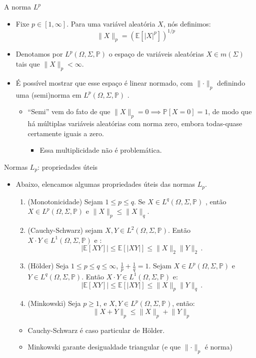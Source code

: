 \documentclass[11pt]{beamer}
\begin{document}
	\begin{frame}{A norma $L^p$}
	\begin{itemize}
		\item Fixe $p \in [1,\infty]$. Para uma variável aleatória $X$, nós definimos:
		$$\lVert X\rVert_p = (\mathbb{E}[|X|^p])^{1/p}$$
		\item Denotamos por $L^p(\Omega, \Sigma, \mathbb{P})$ o espaço de variáveis aleatórias $X \in m(\Sigma)$ tais que $\lVert X\rVert_p<\infty$.
		\item É possível mostrar que esse espaço é linear normado, com $\lVert \cdot \rVert_p$ definindo uma (semi)norma em $L^p(\Omega, \Sigma, \mathbb{P})$ .
		\begin{itemize}
			\item ``Semi'' vem do fato de que $\lVert X \rVert_p = 0 \implies \mathbb{P}[X=0]=1$, de modo que há múltiplas variáveis aleatórias com norma zero, embora todas-quase certamente iguais a zero. 
			\begin{itemize}
				\item Essa multiplicidade não é problemática.
			\end{itemize}
		\end{itemize}
	
	\end{itemize}
	\end{frame}
	\begin{frame}{Normas $L_p$: propriedades úteis}
\begin{itemize}
	\item Abaixo, elencamos algumas propriedades úteis das normas $L_p$.
	\begin{lemma}
		\begin{enumerate}
			\item (Monotonicidade) Sejam $1 \leq p \leq q$. Se $X \in L^q(\Omega, \Sigma, \mathbb{P})$ , então $X \in L^p(\Omega, \Sigma, \mathbb{P})$ e $\lVert X \rVert_p \leq \lVert X \rVert_q$.
				\item (Cauchy-Schwarz) sejam $X,Y \in  L^2(\Omega, \Sigma, \mathbb{P})$. Então $X \cdot Y \in L^1(\Omega, \Sigma, \mathbb{P})$ e :
			$$|\mathbb{E}[XY]| \leq \mathbb{E}[|XY|] \leq \lVert X \rVert_2 \lVert Y \rVert_2\, .$$
			\item (H\"{o}lder) Seja $1 \leq p \leq q \leq \infty$, $\frac{1}{p}+\frac{1}{q} =1$. Sejam $X \in  L^p(\Omega, \Sigma, \mathbb{P})$ e  $Y \in  L^q(\Omega, \Sigma, \mathbb{P})$. Então $X \cdot Y \in L^1(\Omega, \Sigma, \mathbb{P})$  e: 
			$$|\mathbb{E}[XY] | \leq \mathbb{E}[|XY|]  \leq \lVert X \rVert_p   \lVert Y \rVert_q\, .   $$
			\item (Minkowski) Seja $p \geq 1$, e $X,Y \in  L^p(\Omega, \Sigma, \mathbb{P})$, então:
			$$\lVert X+Y\rVert_p \leq \lVert X\rVert_p+\lVert Y\rVert_p $$
		\end{enumerate}
	\end{lemma}
	\begin{itemize}
		\item Cauchy-Schwarz é caso particular de H\"{o}lder.
		\item Minkowski garante desigualdade triangular (e que $\lVert \cdot \rVert_p$ é norma)
	\end{itemize}
\end{itemize}
	\end{frame}
\end{document}

